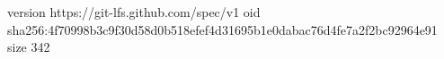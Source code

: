 version https://git-lfs.github.com/spec/v1
oid sha256:4f70998b3c9f30d58d0b518efef4d31695b1e0dabac76d4fe7a2f2bc92964e91
size 342
